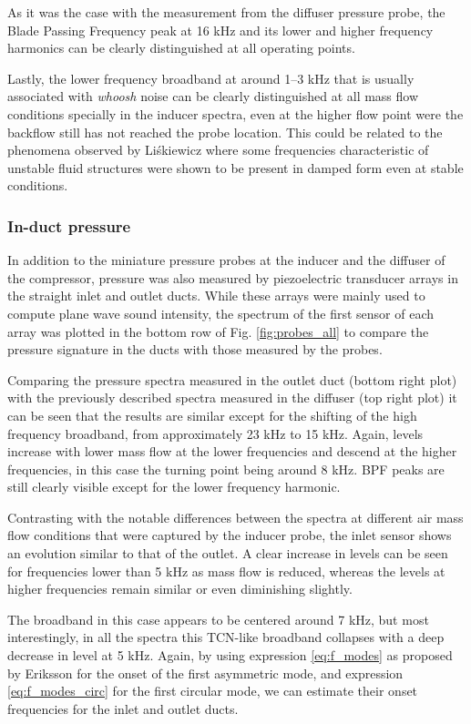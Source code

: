 As it was the case with the measurement from the diffuser pressure probe, the Blade Passing Frequency peak at 16 kHz and its lower and higher frequency harmonics can be clearly distinguished at all operating points.

Lastly, the lower frequency broadband at around 1--3 kHz that is usually associated with \emph{whoosh} noise can be clearly distinguished at all mass flow conditions specially in the inducer spectra, even at the higher flow point were the backflow still has not reached the probe location. This could be related to the phenomena observed by Li\'skiewicz \cite{liskiewicz2014id} where some frequencies characteristic of unstable fluid structures were shown to be present in damped form even at stable conditions.

\subsubsection{In-duct pressure}

In addition to the miniature pressure probes at the inducer and the diffuser of the compressor, pressure was also measured by piezoelectric transducer arrays in the straight inlet and outlet ducts. While these arrays were mainly used to compute plane wave sound intensity, the spectrum of the first sensor of each array was plotted in the bottom row of Fig. \ref{fig:probes_all} to compare the pressure signature in the ducts with those measured by the  probes.

Comparing the pressure spectra measured in the outlet duct (bottom right plot) with the previously described spectra measured in the diffuser (top right plot) it can be seen that the results are similar except for the shifting of the high frequency broadband, from approximately 23 kHz to 15 kHz. Again, levels increase with lower mass flow at the lower frequencies and descend at the higher frequencies, in this case the turning point being around 8 kHz. BPF peaks are still clearly visible except for the lower frequency harmonic.

Contrasting with the notable differences between the spectra at different air mass flow conditions that were captured by the inducer probe, the inlet sensor shows an evolution similar to that of the outlet. A clear increase in levels can be seen for frequencies lower than 5 kHz as mass flow is reduced, whereas the levels at higher frequencies remain similar or even diminishing slightly.

The broadband in this case appears to be centered around 7 kHz, but most interestingly, in all the spectra this TCN-like broadband collapses with a deep decrease in level at 5 kHz. Again, by using expression \ref{eq:f_modes} as proposed by Eriksson \cite{eriksson1980higher} for the onset of the first asymmetric mode, and  expression \ref{eq:f_modes_circ} for the first circular mode, we can estimate their onset frequencies for the inlet and outlet ducts. 

